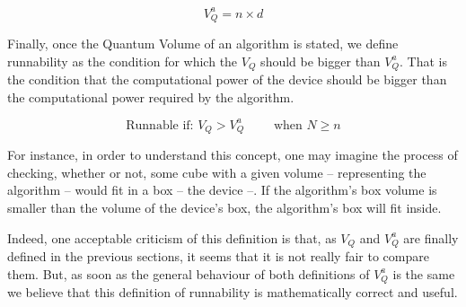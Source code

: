 \begin{equation}
\label{eq:org6aba4aa}
V_Q^a =  n \times d
\end{equation}

Finally, once the Quantum Volume of an algorithm is stated, we define runnability as the condition for which the \(V_Q\) should be bigger than \(V^a_Q\).
That is the condition that the computational power of the device should be bigger than the computational power required by the algorithm.

\begin{equation}
\label{eq:runnability}
\text{Runnable if: } V_Q > V^a_Q \quad \quad \text{ when } N \ge n
\end{equation}

For instance, in order to understand this concept, one may imagine the process of checking, whether or not, some cube with a given volume -- representing the algorithm -- would fit in a box -- the device --.
If the algorithm's box volume is smaller than the volume of the device's box, the algorithm's box will fit inside.

Indeed, one acceptable criticism of this definition is that, as \(V_Q\) and \(V^a_Q\) are finally defined in the previous sections, it seems that it is not really fair to compare them.
But, as soon as the general behaviour of both definitions of \(V^a_Q\) is the same we believe that this definition of runnability is mathematically correct and useful.
